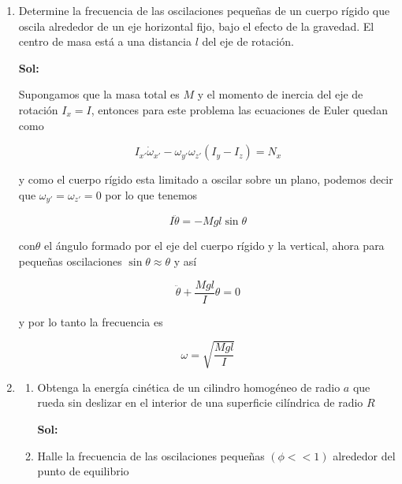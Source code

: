 \documentclass[12pt,a4paper]{article}
\begin{document}
\begin{enumerate}



\item Determine la frecuencia  de las oscilaciones pequeñas de un cuerpo rígido que oscila alrededor de un eje horizontal fijo, bajo el efecto de la gravedad. El centro de masa está a una distancia $l$ del eje de rotación.

\textbf{Sol:}

Supongamos que la masa total es $M$ y el momento de inercia del eje de rotación $I_x = I$, entonces para este problema las ecuaciones de Euler quedan como 

\begin{equation*}
    I_{x'} \dot{\omega}_{x'} - \omega_{y'} \omega_{z'} (I_y - I_z) = N_x
\end{equation*}

y como el cuerpo rígido esta limitado a oscilar sobre un plano, podemos decir que $\omega_{y'} = \omega_{z'} = 0$ por lo que tenemos

\begin{equation*}
    I \ddot{\theta} = - Mgl \sin{\theta}
\end{equation*}

con$\theta$ el ángulo formado por el eje del cuerpo rígido y la vertical, ahora para pequeñas oscilaciones $\sin{\theta} \approx \theta$ y así

\begin{equation*}
    \ddot{\theta} + \frac{Mgl}{I} \theta = 0
 \end{equation*}
 
 y por lo tanto la frecuencia es
 
 \begin{equation*}
     \omega = \sqrt{\frac{Mgl}{I}}
 \end{equation*}








\item 

\begin{enumerate}
    \item Obtenga la energía cinética de un cilindro homogéneo de radio $a$ que rueda sin deslizar en el interior de una superficie cilíndrica de radio $R$ 
    
    \textbf{Sol:}
    
    \item Halle la frecuencia de las oscilaciones pequeñas $(\phi << 1)$ alrededor del punto de equilibrio
    

\end{enumerate}
\end{enumerate}
\end{document}
